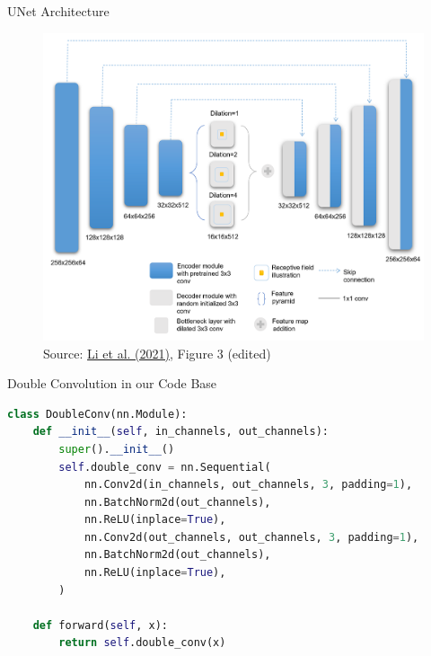 \documentclass{beamer}
\begin{document}
\begin{frame}{UNet Architecture}
    \begin{figure}
        \centering
        \includegraphics[height=0.7\textheight]{Images/UNetArchitecture.png}
        \caption{Source: \href{https://doi.org/10.1117/1.JMI.8.6.067501}{Li et al. (2021)}, Figure 3 (edited)}
    \end{figure}
\end{frame}

\begin{frame}[fragile]{Double Convolution in our Code Base}
    \begin{lstlisting}[language=Python]
class DoubleConv(nn.Module):
    def __init__(self, in_channels, out_channels):
        super().__init__()
        self.double_conv = nn.Sequential(
            nn.Conv2d(in_channels, out_channels, 3, padding=1),
            nn.BatchNorm2d(out_channels),
            nn.ReLU(inplace=True),
            nn.Conv2d(out_channels, out_channels, 3, padding=1),
            nn.BatchNorm2d(out_channels),
            nn.ReLU(inplace=True),
        )

    def forward(self, x):
        return self.double_conv(x)
    \end{lstlisting}
\end{frame}
\end{document}
